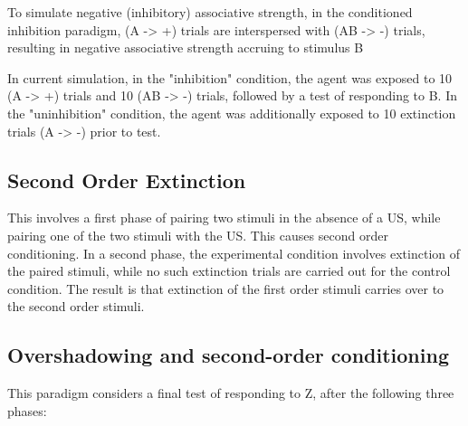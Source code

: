 \documentclass[11pt]{article}
\begin{document}
To simulate negative (inhibitory) associative strength, in the conditioned inhibition paradigm, (A -> +) trials are interspersed with (AB -> -) trials, resulting in negative associative strength accruing to stimulus B   

In current simulation, in the "inhibition" condition, the agent was exposed to 10 (A -> +) trials and 10 (AB -> -) trials, followed by a test of responding to B.    
In the "uninhibition" condition, the agent was additionally exposed to 10 extinction trials (A -> -) prior to test.

\begin{center}

\end{center}

\begin{center}

\end{center}

\begin{center}

\end{center}

\newpage

\subsection{Second Order Extinction}
\label{sec:org47683a7}

This involves a first phase of pairing two stimuli in the absence of a US, while pairing one of the two stimuli with the US. This causes second order conditioning. In a second phase, the experimental condition involves extinction of the paired stimuli, while no such extinction trials are carried out for the control condition. The result is that extinction of the first order stimuli carries over to the second order stimuli.

\begin{center}

\end{center}

\newpage

\subsection{Overshadowing and second-order conditioning}
\label{sec:org259b338}

This paradigm considers a final test of responding to Z, after the following three phases:
\end{document}
